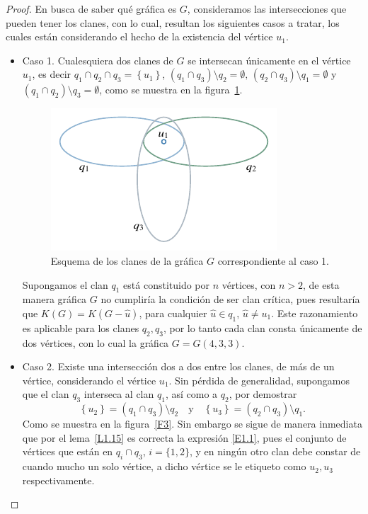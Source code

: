 \documentclass[12pt]{book}
\theoremstyle{definition}
\begin{document}
\begin{proof}
En busca de saber qué gráfica es $G$, consideramos las intersecciones que pueden tener los clanes, con lo cual, resultan los siguientes casos a tratar, los cuales están considerando el hecho de la existencia del vértice $u_1$.
\begin{itemize}
\item Caso 1. 
Cualesquiera dos clanes de $G$ se intersecan únicamente en el vértice $u_1$, es decir $q_1\cap q_2\cap q_3=\left\{u_1\right\}$, $(q_1\cap q_3)\setminus q_2=\emptyset  \text{, }(q_2\cap q_3)\setminus q_1=\emptyset$ y $(q_1\cap q_2)\setminus q_3=\emptyset$, como se muestra en la figura~\ref{F2}.

\begin{figure}[!htbp]
	\centering
	\includegraphics[scale=1.2]{Fig1.pdf}
	\caption{Esquema de los clanes de la gráfica $G$ correspondiente al caso 1.\label{F2}}
\end{figure}
Supongamos el clan $q_1$ está constituido por $n$ vértices, con $n>2$, de esta manera gráfica $G$ no cumpliría la condición de ser clan crítica, pues resultaría que $K(G)=K(G-\hat{u})$, para cualquier $\hat{u}\in q_1$, $\hat{u}\neq u_1$. Este razonamiento es aplicable para los clanes $q_2,q_3$, por lo tanto cada clan consta únicamente de dos vértices, con lo cual la gráfica $G=G(4,3,3)$.


\item Caso 2.
Existe una intersección dos a dos entre los clanes, de más de un vértice, considerando el vértice $u_1$. Sin pérdida de generalidad, supongamos que el clan $q_3$ interseca al clan $q_1$, así como a $q_2$, por demostrar
\begin{equation}\label{E1.1}
\left\{u_2\right\}=(q_1\cap q_3)\setminus q_2 \quad \text{y} \quad \left\{u_3\right\}=(q_2\cap q_3)\setminus q_1.
\end{equation}
Como se muestra en la figura~\ref{F3}. Sin embargo se sigue de manera inmediata que por el lema~\ref{L1.15} es correcta la expresión \eqref{E1.1}, pues el conjunto de vértices que están en $q_i\cap q_3$, $i=\{1,2\}$, y en ningún otro clan debe constar de cuando mucho un solo vértice, a dicho vértice se le etiqueto como $u_2,u_3$ respectivamente.


\end{itemize}
\end{proof}
\end{document}
